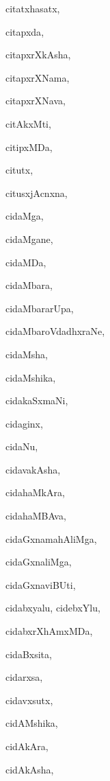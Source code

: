 \begin{multicols}{2}
{citatxhasatx}, \pageref{citatxhasatx}

{citapxda}, \pageref{citapxda}

{citapxrXkAsha}, \pageref{citapxrXkAsha}

{citapxrXNama}, \pageref{citapxrXNama}

{citapxrXNava}, \pageref{citapxrXNava}

{citAkxMti}, \pageref{citAkxMti}

{citipxMDa}, \pageref{citipxMDa}

{citutx}, \pageref{citutx}

{citusxjAcnxna}, \pageref{citusxjAcnxna}

{cidaMga}, \pageref{cidaMga}

{cidaMgane}, \pageref{cidaMgane}

{cidaMDa}, \pageref{cidaMDa}

{cidaMbara}, \pageref{cidaMbara}

{cidaMbararUpa}, \pageref{cidaMbararUpa}

{cidaMbaroVdadhxraNe}, \pageref{cidaMbaroVdadhxraNe}

{cidaMsha}, \pageref{cidaMsha}

{cidaMshika}, \pageref{cidaMshika}

{cidakaSxmaNi}, \pageref{cidakaSxmaNi}

{cidaginx}, \pageref{cidaginx}

{cidaNu}, \pageref{cidaNu}

{cidavakAsha}, \pageref{cidavakAsha}

{cidahaMkAra}, \pageref{cidahaMkAra}

{cidahaMBAva}, \pageref{cidahaMBAva}

{cidaGxnamahAliMga}, \pageref{cidaGxnamahAliMga}

{cidaGxnaliMga}, \pageref{cidaGxnaliMga}

{cidaGxnaviBUti}, \pageref{cidaGxnaviBUti}

{cidabxyalu, cidebxYlu}, \pageref{cidabxyalu, cidebxYlu}

{cidabxrXhAmxMDa}, \pageref{cidabxrXhAmxMDa}

{cidaBxsita}, \pageref{cidaBxsita}

{cidarxsa}, \pageref{cidarxsa}

{cidavxsutx}, \pageref{cidavxsutx}

{cidAMshika}, \pageref{cidAMshika}

{cidAkAra}, \pageref{cidAkAra}

{cidAkAsha}, \pageref{cidAkAsha}


\end{multicols}
